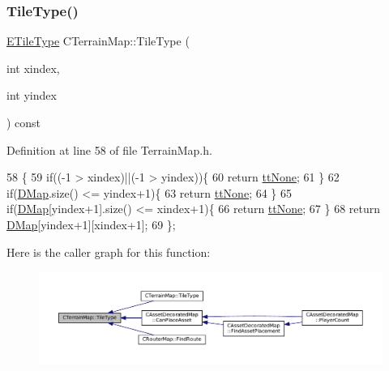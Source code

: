 \subsubsection{\texorpdfstring{Tile\+Type()}{TileType()}\hspace{0.1cm}{\footnotesize\ttfamily [1/2]}}
{\footnotesize\ttfamily \hyperlink{classCTerrainMap_aff2ab991e237269941416dd79d8871d4}{E\+Tile\+Type} C\+Terrain\+Map\+::\+Tile\+Type (\begin{DoxyParamCaption}\item[{int}]{xindex,  }\item[{int}]{yindex }\end{DoxyParamCaption}) const\hspace{0.3cm}{\ttfamily [inline]}}



Definition at line 58 of file Terrain\+Map.\+h.


\begin{DoxyCode}
58                                                         \{
59             \textcolor{keywordflow}{if}((-1 > xindex)||(-1 > yindex))\{
60                 \textcolor{keywordflow}{return} \hyperlink{classCTerrainMap_aff2ab991e237269941416dd79d8871d4a481e779132fb16414d17870bd6229eb5}{ttNone};    
61             \}
62             \textcolor{keywordflow}{if}(\hyperlink{classCTerrainMap_a80d154ce478948b10473534a7bca13f6}{DMap}.size() <= yindex+1)\{
63                 \textcolor{keywordflow}{return} \hyperlink{classCTerrainMap_aff2ab991e237269941416dd79d8871d4a481e779132fb16414d17870bd6229eb5}{ttNone};   
64             \}
65             \textcolor{keywordflow}{if}(\hyperlink{classCTerrainMap_a80d154ce478948b10473534a7bca13f6}{DMap}[yindex+1].size() <= xindex+1)\{
66                 \textcolor{keywordflow}{return} \hyperlink{classCTerrainMap_aff2ab991e237269941416dd79d8871d4a481e779132fb16414d17870bd6229eb5}{ttNone};   
67             \}
68             \textcolor{keywordflow}{return} \hyperlink{classCTerrainMap_a80d154ce478948b10473534a7bca13f6}{DMap}[yindex+1][xindex+1];
69         \};
\end{DoxyCode}
Here is the caller graph for this function\+:\nopagebreak
\begin{figure}[H]
\begin{center}
\leavevmode
\includegraphics[width=350pt]{classCTerrainMap_a7e0e440467a09cb1c59e2bdbec01ccb4_icgraph}
\end{center}
\end{figure}
\hypertarget{classCTerrainMap_a3a7229412b3391835dd6036439e5c6c0}{}\label{classCTerrainMap_a3a7229412b3391835dd6036439e5c6c0} 
